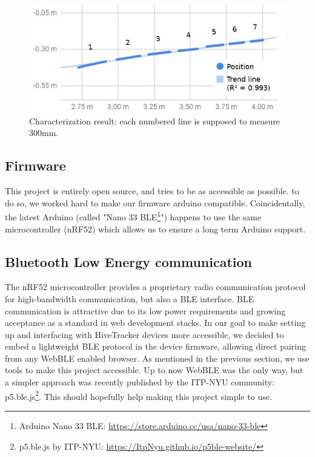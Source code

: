 \documentclass[sigchi]{acmart}
\begin{document}
\begin{figure}[h]
  \centering
  \includegraphics[width=\linewidth]{Figures/characterization_result.jpg}
  \caption{Characterization result: each numbered line is supposed to measure 300mm.}
  \label{Fig:characterization_result}
\end{figure}

\subsection{Firmware}

This project is entirely open source, and tries to be as accessible as possible.
to do so, we worked hard to make our firmware\cite{firmwarerepo} arduino compatible.
Coincidentally, the latest Arduino (called "Nano 33 BLE\footnote{Arduino Nano 33 BLE: \url{https://store.arduino.cc/usa/nano-33-ble}}") happens to use the same microcontroller
(nRF52) which allows us to ensure a long term Arduino support.


\subsection{Bluetooth Low Energy communication}

The nRF52 microcontroller provides a proprietary radio communication protocol for high-bandwidth communication, but also a BLE interface. BLE communication is attractive due to its low power requirements and growing acceptance as a standard in web development stacks. In our goal to make setting up and interfacing with HiveTracker devices more accessible, we decided to embed a lightweight BLE protocol in the device firmware, allowing direct pairing from any WebBLE enabled browser.
As mentioned in the previous section, we use tools to make this project accessible.
Up to now WebBLE was the only way, but a simpler approach was recently published by the ITP-NYU community: p5.ble.js\footnote{p5.ble.js by ITP-NYU: \url{https://ItpNyu.github.io/p5ble-website/}}.
This should hopefully help making this project simple to use.
\end{document}

